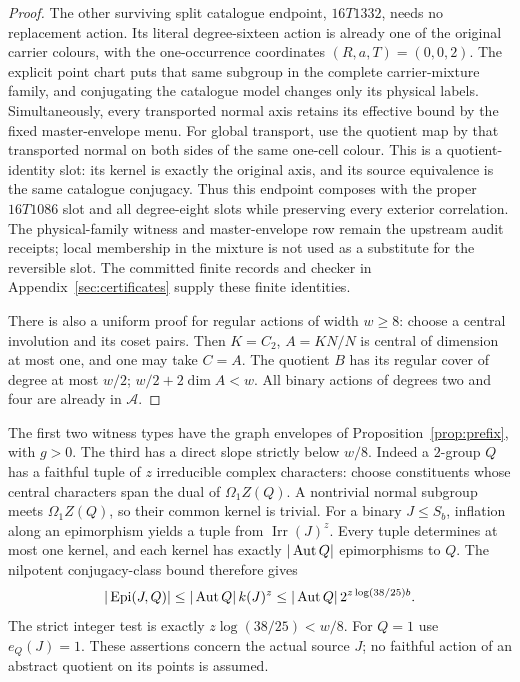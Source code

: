 \begin{proof}
The other surviving split catalogue endpoint, $16T1332$, needs no
replacement action.  Its literal degree-sixteen action is already one of
the original carrier colours, with the one-occurrence coordinates
$(R,a,T)=(0,0,2)$.  The explicit point chart puts that same subgroup in
the complete carrier-mixture family, and conjugating the catalogue model
changes only its physical labels.  Simultaneously, every transported
normal axis retains its effective bound by the fixed master-envelope menu.
For global transport, use the quotient map by that transported normal on
both sides of the same one-cell colour.  This is a quotient-identity slot:
its kernel is exactly the original axis, and its source equivalence is the
same catalogue conjugacy.  Thus this endpoint composes with the proper
$16T1086$ slot and all degree-eight slots while preserving every exterior
correlation.  The physical-family witness and master-envelope row remain
the upstream audit receipts; local membership in the mixture is not used as
a substitute for the reversible slot.
The committed finite records and checker in
Appendix~\ref{sec:certificates} supply these finite identities.

There is also a uniform proof for regular actions of width $w\geq8$:
choose a central involution and its coset pairs. Then $K=C_2$,
$A=KN/N$ is central of dimension at most one, and one may take $C=A$.
The quotient $B$ has its regular cover of degree at most $w/2$;
$w/2+2\dim A<w$. All binary actions of degrees two and four are
already in $\mathcal A$.
\end{proof}

The first two witness types have the graph envelopes of
Proposition~\ref{prop:prefix}, with $g>0$. The third has a direct
slope strictly below $w/8$. Indeed a $2$-group $Q$ has a faithful
tuple of $z$ irreducible complex characters: choose constituents whose
central characters span the dual of $\Omega_1Z(Q)$. A nontrivial
normal subgroup meets $\Omega_1Z(Q)$, so their common kernel is trivial.
For a binary $J\leq S_b$, inflation along an epimorphism yields a
tuple from $\operatorname{Irr}(J)^z$. Every tuple determines at most
one kernel, and each kernel has exactly $|\operatorname{Aut} Q|$ epimorphisms to $Q$.
The nilpotent conjugacy-class bound
\cite[Theorem 1.5]{Maroti2005Classes} therefore gives
\begin{equation}\label{eq:binary-character-entry}
 |\operatorname{Epi}(J,Q)|\leq|\operatorname{Aut} Q|\,k(J)^z
 \leq|\operatorname{Aut} Q|\,2^{z\log(38/25)b}.
\end{equation}
The strict integer test is exactly $z\log(38/25)<w/8$.
For $Q=1$ use $e_Q(J)=1$. These assertions concern the actual source
$J$; no faithful action of an abstract quotient on its points is assumed.

